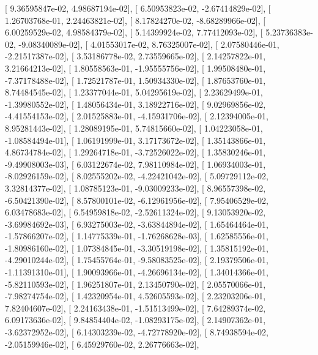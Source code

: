 \documentclass{article}
\begin{document}
       [  9.36595847e-02,   4.98687194e-02],
       [  6.50953823e-02,  -2.67414829e-02],
       [  1.26703768e-01,   2.24463821e-02],
       [  8.17824270e-02,  -8.68289966e-02],
       [  6.00259529e-02,   4.98584379e-02],
       [  5.14399924e-02,   7.77412093e-02],
       [  5.23736383e-02,  -9.08340089e-02],
       [  4.01553017e-02,   8.76325007e-02],
       [  2.07580446e-01,  -2.21517387e-02],
       [  3.53186778e-02,   2.73559665e-02],
       [  2.14257822e-01,   3.21664213e-02],
       [  1.80558563e-01,  -1.95555756e-02],
       [  1.99508480e-01,  -7.37178488e-02],
       [  1.72521787e-01,   1.50934330e-02],
       [  1.87653760e-01,   8.74484545e-02],
       [  1.23377044e-01,   5.04295619e-02],
       [  2.23629499e-01,  -1.39980552e-02],
       [  1.48056434e-01,   3.18922716e-02],
       [  9.02969856e-02,  -4.41554153e-02],
       [  2.01525883e-01,  -4.15931706e-02],
       [  2.12394005e-01,   8.95281443e-02],
       [  1.28089195e-01,   5.74815660e-02],
       [  1.04223058e-01,  -1.08584494e-01],
       [  1.06191999e-01,   3.17173672e-02],
       [  1.35143866e-01,   4.86734784e-02],
       [  1.29264718e-01,  -3.72526022e-02],
       [  1.35830246e-01,  -9.49908003e-03],
       [  6.03122674e-02,   7.98110984e-02],
       [  1.06934003e-01,  -8.02926159e-02],
       [  8.02555202e-02,  -4.22421042e-02],
       [  5.09729112e-02,   3.32814377e-02],
       [  1.08785123e-01,  -9.03009233e-02],
       [  8.96557398e-02,  -6.50421390e-02],
       [  8.57800101e-02,  -6.12961956e-02],
       [  7.95406529e-02,   6.03478683e-02],
       [  6.54959818e-02,  -2.52611324e-02],
       [  9.13053920e-02,  -3.69984692e-03],
       [  6.93275003e-02,  -3.63844894e-02],
       [  1.65464464e-01,  -1.57866207e-02],
       [  1.14775339e-01,  -1.76268628e-03],
       [  1.62585556e-01,  -1.80986160e-02],
       [  1.07384845e-01,  -3.30519198e-02],
       [  1.35815192e-01,  -4.29010244e-02],
       [  1.75455764e-01,  -9.58083525e-02],
       [  2.19379506e-01,  -1.11391310e-01],
       [  1.90093966e-01,  -4.26696134e-02],
       [  1.34014366e-01,  -5.82110593e-02],
       [  1.96251807e-01,   2.13450790e-02],
       [  2.05570066e-01,  -7.98274754e-02],
       [  1.42320954e-01,   4.52605593e-02],
       [  2.23203206e-01,   7.82404607e-02],
       [  2.24163438e-01,  -1.51513499e-02],
       [  7.64289374e-02,   6.09173636e-02],
       [  9.84854404e-02,  -1.08293175e-02],
       [  2.14907362e-01,  -3.62372952e-02],
       [  6.14303239e-02,  -4.72778920e-02],
       [  8.74938594e-02,  -2.05159946e-02],
       [  6.45929760e-02,   2.26776663e-02],
\end{document}

